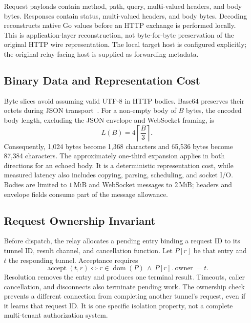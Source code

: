 \documentclass[conference,letterpaper]{IEEEtran}
\newcommand{\MiB}{\,\mathrm{MiB}}
\begin{document}
Request payloads contain method, path, query, multi-valued headers, and body
bytes. Responses contain status, multi-valued headers, and body bytes. Decoding
reconstructs native Go values before an HTTP exchange is performed locally.
This is application-layer reconstruction, not byte-for-byte preservation of
the original HTTP wire representation. The local target host is configured
explicitly; the original relay-facing host is supplied as forwarding metadata.

\subsection{Binary Data and Representation Cost}
Byte slices avoid assuming valid UTF-8 in HTTP bodies. Base64 preserves their
octets during JSON transport~\cite{gojson}. For a non-empty body of $B$ bytes,
the encoded body length, excluding the JSON envelope and WebSocket framing, is
\begin{equation}
 L(B)=4\left\lceil\frac{B}{3}\right\rceil.
 \label{eq:base64}
\end{equation}
Consequently, 1,024 bytes become 1,368 characters and 65,536 bytes become 87,384
characters. The approximately one-third expansion applies in both directions
for an echoed body. It is a deterministic representation cost, while measured
latency also includes copying, parsing, scheduling, and socket I/O. Bodies are
limited to $1\MiB$ and WebSocket messages to $2\MiB$; headers and envelope fields
consume part of the message allowance.

\subsection{Request Ownership Invariant}
Before dispatch, the relay allocates a pending entry binding a request ID to its
tunnel ID, result channel, and cancellation function. Let $P[r]$ be that entry
and $t$ the responding tunnel. Acceptance requires
\begin{equation}
 \operatorname{accept}(t,r)
 \iff r\in\operatorname{dom}(P)\ \land\ P[r].\operatorname{owner}=t.
 \label{eq:ownership}
\end{equation}
Resolution removes the entry and produces one terminal result. Timeouts,
caller cancellation, and disconnects also terminate pending work. The ownership
check prevents a different connection from completing another tunnel's request,
even if it learns that request ID. It is one specific isolation property, not
a complete multi-tenant authorization system.
\end{document}
